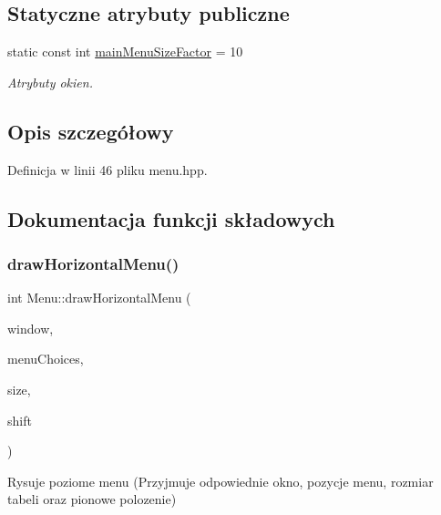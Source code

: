 \subsection*{Statyczne atrybuty publiczne}
\begin{DoxyCompactItemize}
\item 
\mbox{\label{class_menu_a2b3a53b8e554105fd9cf078604f1d455}} 
static const int \mbox{\hyperlink{class_menu_a2b3a53b8e554105fd9cf078604f1d455}{main\+Menu\+Size\+Factor}} = 10
\begin{DoxyCompactList}\small\item\em Atrybuty okien. \end{DoxyCompactList}\end{DoxyCompactItemize}


\subsection{Opis szczegółowy}


Definicja w linii 46 pliku menu.\+hpp.



\subsection{Dokumentacja funkcji składowych}
\mbox{\label{class_menu_a22e5c26ac2b73a702749a0229ad4fcba}} 
\subsubsection{\texorpdfstring{draw\+Horizontal\+Menu()}{drawHorizontalMenu()}}
{\footnotesize\ttfamily int Menu\+::draw\+Horizontal\+Menu (\begin{DoxyParamCaption}\item[{W\+I\+N\+D\+OW $\ast$}]{window,  }\item[{const std\+::string $\ast$}]{menu\+Choices,  }\item[{unsigned int}]{size,  }\item[{unsigned int}]{shift }\end{DoxyParamCaption})\hspace{0.3cm}{\ttfamily [static]}}

Rysuje poziome menu (Przyjmuje odpowiednie okno, pozycje menu, rozmiar tabeli oraz pionowe polozenie) 

